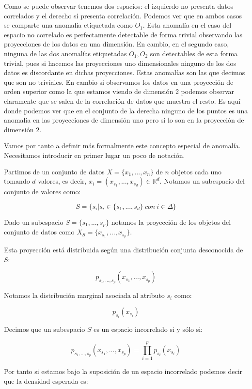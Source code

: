 Como se puede observar tenemos dos espacios: el izquierdo no presenta datos correlados y el derecho sí presenta correlación. Podemos ver que en ambos casos se comparte una anomalía etiquetada como $O_1$. Esta anomalía en el caso del espacio no correlado es perfectamente detectable de forma trivial observando las proyecciones de los datos en una dimensión. En cambio, en el segundo caso, ninguna de las dos anomalías etiquetadas $O_1 , O_2$ son detectables de esta forma trivial, pues si hacemos las proyecciones uno dimensionales ninguno de los dos datos es discordante en dichas proyecciones. Estas anomalías son las que decimos que son no triviales. En cambio si observamos los datos en una proyección de orden superior como la que estamos viendo de dimensión 2 podemos observar claramente que se salen de la correlación de datos que muestra el resto. Es aquí donde podemos ver que en el conjunto de la derecha ninguno de los puntos es una anomalía en las proyecciones de dimensión uno pero sí lo son en la proyección de dimensión 2.

Vamos por tanto a definir más formalmente este concepto especial de anomalía. Necesitamos introducir en primer lugar un poco de notación.

Partimos de un conjunto de datos $X = \{ x_1 , ... , x_n \}$ de $n$ objetos cada uno tomando $d$ valores, es decir, $x_i = (x_{s_1} , ... , x_{s_d}) \in \mathbb{R}^d$. Notamos un subespacio del conjunto de valores como:

$$S = \{ s_i | s_i \in \{ s_1 , ... , s_d \} \ con \ i\in \Delta \}$$

Dado un subespacio $S = \{ s_1 , ... , s_p \}$ notamos la proyección de los objetos del conjunto de datos como $X_{S} = \{ x_{s_1} , ... , x_{s_p} \}$.

Esta proyección está distribuida según una distribución conjunta desconocida de $S$:

$$p_{s_1 , ... , s_p} (x_{s_1} , ... , x_{s_p})$$

Notamos la distribución marginal asociada al atributo $s_i$ como:

$$p_{s_i}(x_{s_i})$$

\begin{definicion}
	Decimos que un subespacio $S$ es un espacio incorrelado si y sólo si:
	
	$$p_{s_1 , ... , s_p}(x_{s_1} , ... , x_{s_p}) = \prod_{i=1}^{p}p_{s_i}(x_{s_i})$$
\end{definicion}

Por tanto si estamos bajo la suposición de un espacio incorrelado podemos decir que la densidad esperada es:

